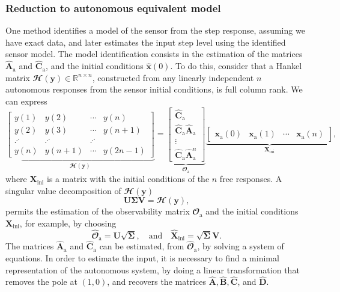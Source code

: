 \subsubsection{Reduction to autonomous equivalent model}

One method identifies a model of the sensor from the step response, assuming we have exact data, and later estimates the input step level using the identified sensor model.
The model identification consists in the estimation of the matrices $\widehat{\mathbf{A}}_\text{a}$ and $\widehat{\mathbf{C}}_\text{a}$, and the initial conditions $\widehat{\mathbf{x}}(0)$.
To do this, consider that a Hankel matrix $\mathbfcal{H}(\mathbf{y}) \in \mathbb{R}^{n \times n}$, constructed from any linearly independent $n$ autonomous responses from the sensor initial conditions, is full column rank.
We can express 
\[ \underbrace{ \begin{bmatrix} y(1) & y(2) & \cdots & y(n) \\ y(2) & y(3) & \cdots & y(n+1) \\ \iddots & \iddots & \iddots \\ y(n) & y(n+1) & \cdots & y(2n-1) \end{bmatrix} }_{ \mathbfcal{H}(\mathbf{y}) }= \underbrace{ \begin{bmatrix} \widehat{\mathbf{C}}_\text{a} \\ \widehat{\mathbf{C}}_\text{a} \widehat{\mathbf{A}}_\text{a} \\ \vdots \\ \widehat{\mathbf{C}}_\text{a} \widehat{\mathbf{A}}_\text{a}^{n} \end{bmatrix} }_{ \mathbfcal{O}_\text{a} }  \underbrace{ \begin{bmatrix} \mathbf{x}_\text{a}(0) & \mathbf{x}_\text{a}(1) & \cdots & \mathbf{x}_\text{a}(n) \end{bmatrix} }_{ \mathbf{X}_\text{ini} } , \]
where $\mathbf{X}_\text{ini}$ is a matrix with the initial conditions of the $n$ free responses. 
A singular value decomposition of $\mathbfcal{H}(\mathbf{y})$ 
\[ \mathbf{U} \bm{\Sigma} \mathbf{V} = \mathbfcal{H}(\mathbf{y}), \]
permits the estimation of the observability matrix $\mathbfcal{O}_\text{a}$ and the initial conditions $\mathbf{X}_\text{ini}$, for example, by choosing
\[ \widehat{\mathbfcal{O}}_\text{a} = \mathbf{U} \sqrt{\bm{\Sigma}}, \quad \text{and} \quad \widehat{\mathbf{X}}_\text{ini} = \sqrt{\bm{\Sigma}} \mathbf{V} . \]
The matrices $\widehat{\mathbf{A}}_\text{a}$ and $\widehat{\mathbf{C}}_\text{a}$ can be estimated, from $\widehat{\mathbfcal{O}}_\text{a}$, by solving a system of equations.
In order to estimate the input, it is necessary to find a minimal representation of the autonomous system, by doing a linear transformation that removes the pole at $(1,0)$, and recovers the matrices $\widehat{\mathbf{A}}, \widehat{\mathbf{B}}, \widehat{\mathbf{C}}$, and $\widehat{\mathbf{D}}$.  


